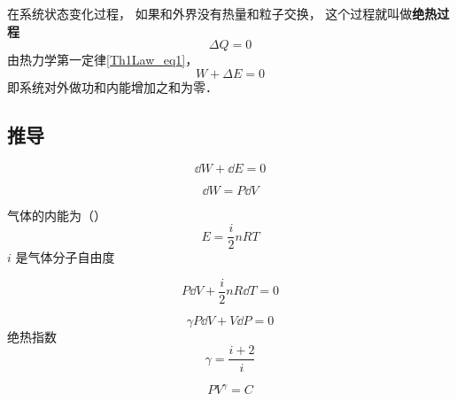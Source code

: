 

在系统状态变化过程， 如果和外界没有热量和粒子交换， 这个过程就叫做\textbf{绝热过程}
\begin{equation}
\Delta Q = 0
\end{equation}
由热力学第一定律\autoref{Th1Law_eq1}，
\begin{equation}
W + \Delta E = 0
\end{equation}
即系统对外做功和内能增加之和为零．

\subsection{推导}
\begin{equation}
\dd{W} + \dd{E} = 0
\end{equation}

\begin{equation}
\dd{W} = P\dd{V}
\end{equation}

气体的内能为（）
\begin{equation}
E = \frac{i}{2}n RT
\end{equation}
$i$ 是气体分子自由度

\begin{equation}
P\dd{V} + \frac{i}{2}nR\dd{T} = 0
\end{equation}

\begin{equation}
\gamma P\dd{V} + V \dd{P} = 0
\end{equation}
绝热指数
\begin{equation}
\gamma = \frac{i+2}{i}
\end{equation}

\begin{equation}
P V^\gamma = C
\end{equation}
